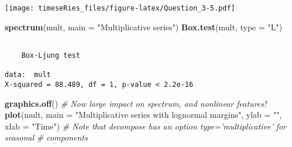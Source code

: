 \documentclass[]{book}
\newenvironment{Shaded}{\begin{snugshade}}{\end{snugshade}}
\newcommand{\CommentTok}[1]{\textcolor[rgb]{0.56,0.35,0.01}{\textit{#1}}}
\newcommand{\ControlFlowTok}[1]{\textcolor[rgb]{0.13,0.29,0.53}{\textbf{#1}}}
\newcommand{\DataTypeTok}[1]{\textcolor[rgb]{0.13,0.29,0.53}{#1}}
\newcommand{\DecValTok}[1]{\textcolor[rgb]{0.00,0.00,0.81}{#1}}
\newcommand{\KeywordTok}[1]{\textcolor[rgb]{0.13,0.29,0.53}{\textbf{#1}}}
\newcommand{\NormalTok}[1]{#1}
\newcommand{\OperatorTok}[1]{\textcolor[rgb]{0.81,0.36,0.00}{\textbf{#1}}}
\newcommand{\StringTok}[1]{\textcolor[rgb]{0.31,0.60,0.02}{#1}}
\begin{document}
\begin{Shaded}
\end{Shaded}

\texttt{[image: timeseRies\_files/figure-latex/Question\_3-5.pdf]}

\begin{Shaded}
\begin{Highlighting}[]
\KeywordTok{spectrum}\NormalTok{(mult, }\DataTypeTok{main =} \StringTok{"Multiplicative series"}\NormalTok{)}
\KeywordTok{Box.test}\NormalTok{(mult, }\DataTypeTok{type =} \StringTok{"L"}\NormalTok{)}
\end{Highlighting}
\end{Shaded}

\begin{verbatim}

    Box-Ljung test

data:  mult
X-squared = 88.489, df = 1, p-value < 2.2e-16
\end{verbatim}

\begin{Shaded}
\begin{Highlighting}[]
\KeywordTok{graphics.off}\NormalTok{()}
\CommentTok{# Now large impact on spectrum, and nonlinear features!}
\KeywordTok{plot}\NormalTok{(mult, }\DataTypeTok{main =} \StringTok{"Multiplicative series with lognormal margins"}\NormalTok{, }\DataTypeTok{ylab =} \StringTok{""}\NormalTok{, }
    \DataTypeTok{xlab =} \StringTok{"Time"}\NormalTok{)}
\CommentTok{# Note that decompose has an option type='multiplicative' for seasonal}
\CommentTok{# components}
\end{Highlighting}
\end{Shaded}
\end{document}
